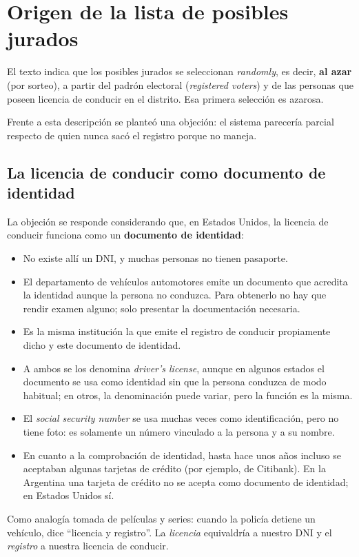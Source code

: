 \documentclass[12pt,oneside]{book}
\begin{document}
\section{Origen de la lista de posibles jurados}

El texto indica que los posibles jurados se seleccionan \textit{randomly}, es decir, \textbf{al azar} (por sorteo), a partir del padrón electoral (\textit{registered voters}) y de las personas que poseen licencia de conducir en el distrito. Esa primera selección es azarosa.

Frente a esta descripción se planteó una objeción: el sistema parecería parcial respecto de quien nunca sacó el registro porque no maneja.

\subsection{La licencia de conducir como documento de identidad}

La objeción se responde considerando que, en Estados Unidos, la licencia de conducir funciona como un \textbf{documento de identidad}:
\begin{itemize}
\item No existe allí un DNI, y muchas personas no tienen pasaporte.
\item El departamento de vehículos automotores emite un documento que acredita la identidad aunque la persona no conduzca. Para obtenerlo no hay que rendir examen alguno; solo presentar la documentación necesaria.
\item Es la misma institución la que emite el registro de conducir propiamente dicho y este documento de identidad.
\item A ambos se los denomina \textit{driver's license}, aunque en algunos estados el documento se usa como identidad sin que la persona conduzca de modo habitual; en otros, la denominación puede variar, pero la función es la misma.
\item El \textit{social security number} se usa muchas veces como identificación, pero no tiene foto: es solamente un número vinculado a la persona y a su nombre.
\item En cuanto a la comprobación de identidad, hasta hace unos años incluso se aceptaban algunas tarjetas de crédito (por ejemplo, de Citibank). En la Argentina una tarjeta de crédito no se acepta como documento de identidad; en Estados Unidos sí.
\end{itemize}

Como analogía tomada de películas y series: cuando la policía detiene un vehículo, dice ``licencia y registro''. La \textit{licencia} equivaldría a nuestro DNI y el \textit{registro} a nuestra licencia de conducir.
\end{document}
